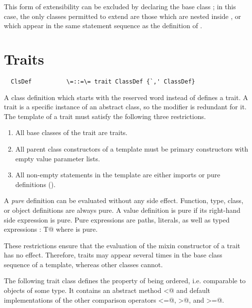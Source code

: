\documentclass[11pt]{report}
\begin{document}
This form of extensibility can be excluded by declaring the base class
\verb@Expr@ \verb@sealed@; in this case, the only classes permitted to
extend \verb@Expr@ are those which are nested inside \verb@Expr@, or
which appear in the same statement sequence as the definition of
\verb@Expr@.

\section{Traits}

\label{sec:traits}

\syntax\begin{verbatim}
  ClsDef          \=::=\= trait ClassDef {`,' ClassDef}
\end{verbatim}

A class definition which starts with the reserved word \verb@trait@
instead of \verb@class@ defines a trait. A trait is a specific
instance of an abstract class, so the \verb@abstract@ modifier is
redundant for it.  The template of a trait must satisfy the following
three restrictions.
\begin{enumerate}
\item All base classes of the trait are traits.
\item All parent class constructors of a template
      must be primary constructors with empty value
      parameter lists. 
\item All non-empty statements in the template are either imports or pure definitions ().
\end{enumerate}
A {\em pure} definition can be evaluated without any side effect.
Function, type, class, or object definitions are always pure. A value
definition is pure if its right-hand side expression is pure. Pure
expressions are paths, literals, as well as typed expressions
\verb@e: T@ where \verb@e@ is pure.

These restrictions ensure that the evaluation of the mixin constructor
of a trait has no effect. Therefore, traits may appear several times 
in the base class sequence of a template, whereas other classes cannot.

\example\label{ex:comparable}
The following trait class defines the property of being
ordered, i.e. comparable to objects of some type. It contains an abstract method
\verb@<@ and default implementations of the other comparison operators
\verb@<=@, \verb@>@, and \verb@>=@.
\end{document}
